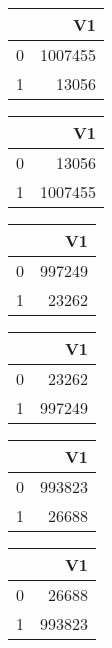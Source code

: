\bigskip\bigskip
\centering
\begin{tabular}{rr}
  \hline
 & V1 \\ 
  \hline
0 & 1007455 \\ 
  1 & 13056 \\ 
   \hline
\end{tabular}

\bigskip\bigskip
\centering
\begin{tabular}{rr}
  \hline
 & V1 \\ 
  \hline
0 & 13056 \\ 
  1 & 1007455 \\ 
   \hline
\end{tabular}

\bigskip\bigskip
\centering
\begin{tabular}{rr}
  \hline
 & V1 \\ 
  \hline
0 & 997249 \\ 
  1 & 23262 \\ 
   \hline
\end{tabular}

\bigskip\bigskip
\centering
\begin{tabular}{rr}
  \hline
 & V1 \\ 
  \hline
0 & 23262 \\ 
  1 & 997249 \\ 
   \hline
\end{tabular}

\bigskip\bigskip
\centering
\begin{tabular}{rr}
  \hline
 & V1 \\ 
  \hline
0 & 993823 \\ 
  1 & 26688 \\ 
   \hline
\end{tabular}

\bigskip\bigskip
\centering
\begin{tabular}{rr}
  \hline
 & V1 \\ 
  \hline
0 & 26688 \\ 
  1 & 993823 \\ 
   \hline
\end{tabular}

